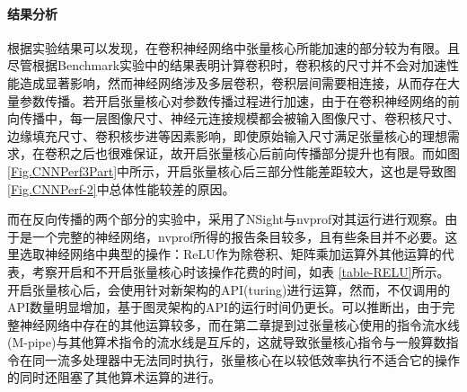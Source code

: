 \paragraph{结果分析}
\par 根据实验结果可以发现，在卷积神经网络中张量核心所能加速的部分较为有限。且尽管根据Benchmark实验中的结果表明计算卷积时，卷积核的尺寸并不会对加速性能造成显著影响，然而神经网络涉及多层卷积，卷积层间需要相连接，从而存在大量参数传播。若开启张量核心对参数传播过程进行加速，由于在卷积神经网络的前向传播中，每一层图像尺寸、神经元连接规模都会被输入图像尺寸、卷积核尺寸、边缘填充尺寸、卷积核步进等因素影响，即使原始输入尺寸满足张量核心的理想需求，在卷积之后也很难保证，故开启张量核心后前向传播部分提升也有限。而如图 \ref{Fig.CNNPerf3Part}中所示，开启张量核心后三部分性能差距较大，这也是导致图 \ref{Fig.CNNPerf-2}中总体性能较差的原因。
\par 而在反向传播的两个部分的实验中，采用了NSight与nvprof对其运行进行观察。由于是一个完整的神经网络，nvprof所得的报告条目较多，且有些条目并不必要。这里选取神经网络中典型的操作：ReLU作为除卷积、矩阵乘加运算外其他运算的代表，考察开启和不开启张量核心时该操作花费的时间，如表 \ref{table-RELU}所示。开启张量核心后，会使用针对新架构的API(turing)进行运算，然而，不仅调用的API数量明显增加，基于图灵架构的API的运行时间仍更长。可以推断出，由于完整神经网络中存在的其他运算较多，而在第二章提到过张量核心使用的指令流水线(M-pipe)与其他算术指令的流水线是互斥的，这就导致张量核心指令与一般算数指令在同一流多处理器中无法同时执行，张量核心在以较低效率执行不适合它的操作的同时还阻塞了其他算术运算的进行。
